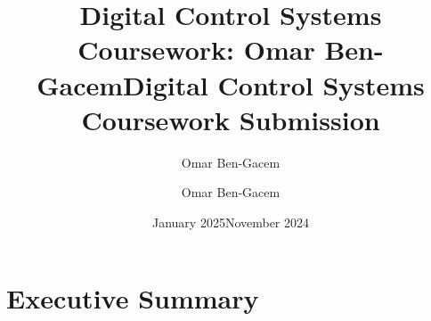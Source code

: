 \documentclass{article}
\title{Digital Control Systems Coursework: Omar Ben-Gacem}
\author{Omar Ben-Gacem}
\date{January 2025}
\title{Digital Control Systems Coursework Submission}
\author{Omar Ben-Gacem}
\date{November 2024}
\begin{document}
\section*{Executive Summary}

\end{document}

